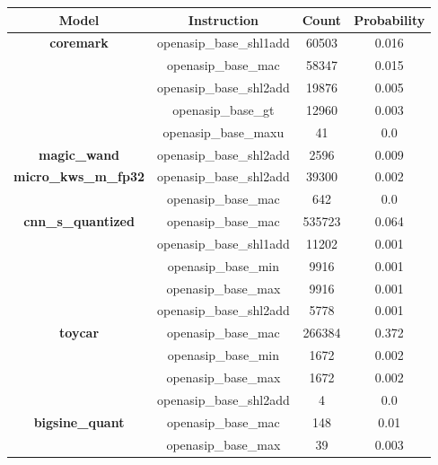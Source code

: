 \begin{table}[!hp]
    \footnotesize
    \centering
    \begin{tabular}{|c|c|c|c|}
        \hline
        \textbf{Model} & \textbf{Instruction} & \textbf{Count} & \textbf{Probability} \\ \hline
        \textbf{coremark} & openasip\_base\_shl1add & 60503 & 0.016 \\ \cline{2-4}
                           & openasip\_base\_mac     & 58347 & 0.015 \\ \cline{2-4}
                           & openasip\_base\_shl2add & 19876 & 0.005 \\ \cline{2-4}
                           & openasip\_base\_gt      & 12960 & 0.003 \\ \cline{2-4}
                           & openasip\_base\_maxu    & 41    & 0.0   \\ \hline
        \textbf{magic\_wand} & openasip\_base\_shl2add & 2596 & 0.009 \\ \hline
        \textbf{micro\_kws\_m\_fp32} & openasip\_base\_shl2add & 39300 & 0.002 \\ \cline{2-4}
                                       & openasip\_base\_mac     & 642   & 0.0   \\ \hline
        \textbf{cnn\_s\_quantized} & openasip\_base\_mac     & 535723 & 0.064 \\ \cline{2-4}
                                    & openasip\_base\_shl1add & 11202  & 0.001 \\ \cline{2-4}
                                    & openasip\_base\_min     & 9916   & 0.001 \\ \cline{2-4}
                                    & openasip\_base\_max     & 9916   & 0.001 \\ \cline{2-4}
                                    & openasip\_base\_shl2add & 5778   & 0.001 \\ \hline
        \textbf{toycar} & openasip\_base\_mac     & 266384 & 0.372 \\ \cline{2-4}
                         & openasip\_base\_min     & 1672   & 0.002 \\ \cline{2-4}
                         & openasip\_base\_max     & 1672   & 0.002 \\ \cline{2-4}
                         & openasip\_base\_shl2add & 4      & 0.0   \\ \hline
        \textbf{bigsine\_quant} & openasip\_base\_mac     & 148  & 0.01  \\ \cline{2-4}
                                  & openasip\_base\_max     & 39   & 0.003 \\ \cline{2-4}

\end{tabular}
\end{table}
